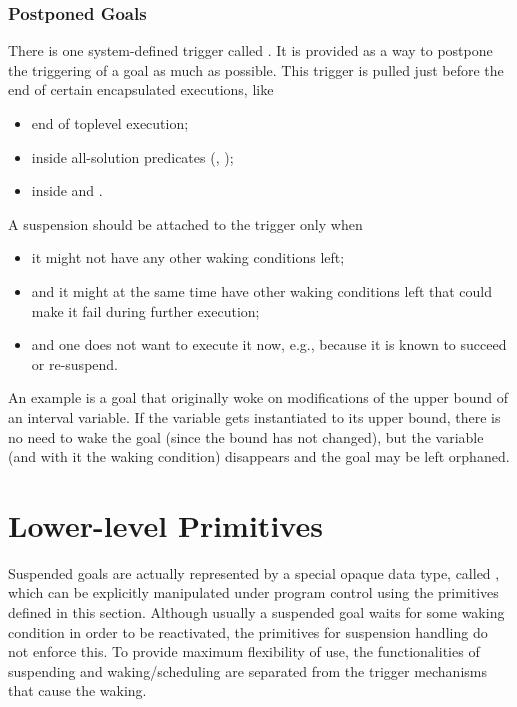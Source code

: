 \subsubsection{Postponed Goals}
There is one system-defined trigger called .%
It is provided as a way to postpone the triggering of a goal as much
as possible. This trigger is pulled just before the end of
certain encapsulated executions, like
\begin{itemize}
\item end of toplevel execution;
\item inside all-solution predicates
  (,
  );
\item inside  and
  .
\end{itemize}
A suspension should be attached to the  trigger only when
\begin{itemize}
\item it might not have any other waking conditions left;
\item and it might at the same time have other waking conditions left
        that could make it fail during further execution;
\item and one does not want to execute it now, e.g., because it is known
        to succeed or re-suspend.
\end{itemize}
An example is a goal that originally woke on modifications of the upper
bound of an interval variable. If the variable gets instantiated to its
upper bound, there is no need to wake the goal (since the bound has not
changed), but the variable (and with it the waking condition) disappears
and the goal may be left orphaned.




\section{Lower-level Primitives}

Suspended goals are actually represented by a special
opaque data type, called , which can be explicitly
manipulated under program control using the primitives defined in
this section.
Although usually a suspended goal waits for some waking condition
in order to be reactivated, the primitives for suspension handling
do not enforce this. To provide maximum flexibility of use,
the functionalities of suspending and waking/scheduling are
separated from the trigger mechanisms that cause the waking.


